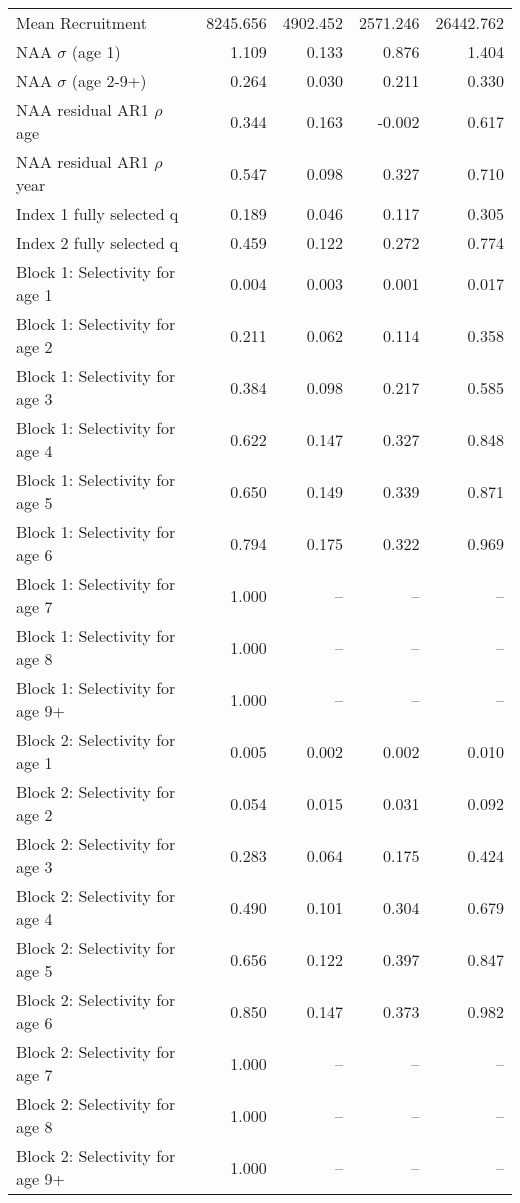 \documentclass[
]{article}
\begin{document}
\begin{landscape}
\begin{longtable}[t]{lrrrr}
\endfoot
\bottomrule
\endlastfoot
Mean Recruitment & 8245.656 & 4902.452 & 2571.246 & 26442.762\\
NAA $\sigma$ (age 1) & 1.109 & 0.133 & 0.876 & 1.404\\
NAA $\sigma$ (age 2-9+) & 0.264 & 0.030 & 0.211 & 0.330\\
NAA residual AR1 $\rho$ age & 0.344 & 0.163 & -0.002 & 0.617\\
NAA residual AR1 $\rho$ year & 0.547 & 0.098 & 0.327 & 0.710\\
\addlinespace
Index 1 fully selected q & 0.189 & 0.046 & 0.117 & 0.305\\
Index 2 fully selected q & 0.459 & 0.122 & 0.272 & 0.774\\
Block 1: Selectivity for age 1 & 0.004 & 0.003 & 0.001 & 0.017\\
Block 1: Selectivity for age 2 & 0.211 & 0.062 & 0.114 & 0.358\\
Block 1: Selectivity for age 3 & 0.384 & 0.098 & 0.217 & 0.585\\
\addlinespace
Block 1: Selectivity for age 4 & 0.622 & 0.147 & 0.327 & 0.848\\
Block 1: Selectivity for age 5 & 0.650 & 0.149 & 0.339 & 0.871\\
Block 1: Selectivity for age 6 & 0.794 & 0.175 & 0.322 & 0.969\\
Block 1: Selectivity for age 7 & 1.000 & -- & -- & --\\
Block 1: Selectivity for age 8 & 1.000 & -- & -- & --\\
\addlinespace
Block 1: Selectivity for age 9+ & 1.000 & -- & -- & --\\
Block 2: Selectivity for age 1 & 0.005 & 0.002 & 0.002 & 0.010\\
Block 2: Selectivity for age 2 & 0.054 & 0.015 & 0.031 & 0.092\\
Block 2: Selectivity for age 3 & 0.283 & 0.064 & 0.175 & 0.424\\
Block 2: Selectivity for age 4 & 0.490 & 0.101 & 0.304 & 0.679\\
\addlinespace
Block 2: Selectivity for age 5 & 0.656 & 0.122 & 0.397 & 0.847\\
Block 2: Selectivity for age 6 & 0.850 & 0.147 & 0.373 & 0.982\\
Block 2: Selectivity for age 7 & 1.000 & -- & -- & --\\
Block 2: Selectivity for age 8 & 1.000 & -- & -- & --\\
Block 2: Selectivity for age 9+ & 1.000 & -- & -- & --\\

\end{longtable}
\end{landscape}
\end{document}
